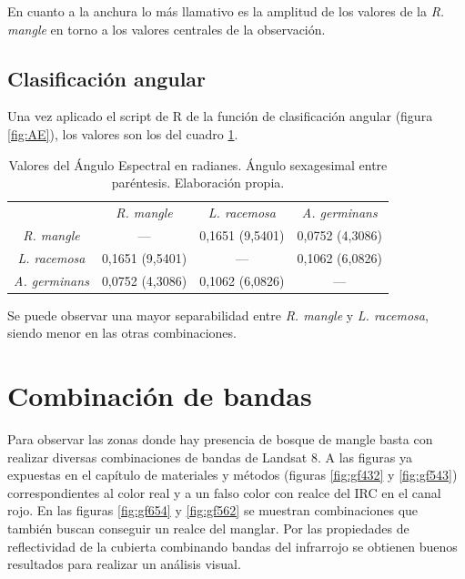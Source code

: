 En cuanto a la anchura lo más llamativo es la amplitud de los valores de la \textit{R. mangle} en torno a los valores centrales de la observación.

\subsection{Clasificación angular}
Una vez aplicado el script de R de la función de clasificación angular (figura \ref{fig:AE}), los valores son los del cuadro \ref{tab:valoresAE}.

\begin{table}[ht]
	\centering	
	\begin{tabular}{@{}cccc@{}}
	\toprule[0.4mm]
	& \textit{R. mangle} & \textit{L. racemosa} & \textit{A. germinans} \\
	\textit{R. mangle} & --- & 0,1651 (9,5401) & 0,0752 (4,3086) \\
	\textit{L. racemosa} & 0,1651 (9,5401) & --- & 0,1062 (6,0826) \\
	\textit{A. germinans} & 0,0752 (4,3086) & 0,1062 (6,0826) & --- \\
	\bottomrule[0.4mm]
	\end{tabular}
	\caption[Valores de Ángulo Espectral]{Valores del Ángulo Espectral en radianes. Ángulo sexagesimal entre paréntesis. Elaboración propia.}
	\label{tab:valoresAE}
\end{table}

Se puede observar una mayor separabilidad entre \textit{R. mangle} y \textit{L. racemosa}, siendo menor en las otras combinaciones.

\section{Combinación de bandas}
Para observar las zonas donde hay presencia de bosque de mangle basta con realizar diversas combinaciones de bandas de Landsat 8. A las figuras ya expuestas en el capítulo de materiales y métodos (figuras \ref{fig:gf432} y \ref{fig:gf543}) correspondientes al color real y a un falso color con realce del \ac{IRC} en el canal rojo. En las figuras \ref{fig:gf654} y \ref{fig:gf562} se muestran combinaciones que también buscan conseguir un realce del manglar. Por las propiedades de reflectividad de la cubierta combinando bandas del infrarrojo se obtienen buenos resultados para realizar un análisis visual.


